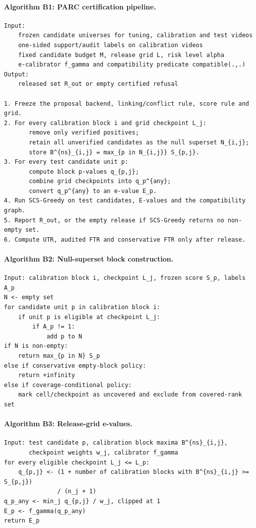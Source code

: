 \documentclass[11pt]{article}
\begin{document}
\paragraph{Algorithm B1: PARC certification pipeline.}
\begin{verbatim}
Input:
    frozen candidate universes for tuning, calibration and test videos
    one-sided support/audit labels on calibration videos
    fixed candidate budget M, release grid L, risk level alpha
    e-calibrator f_gamma and compatibility predicate compatible(.,.)
Output:
    released set R_out or empty certified refusal

1. Freeze the proposal backend, linking/conflict rule, score rule and grid.
2. For every calibration block i and grid checkpoint L_j:
       remove only verified positives;
       retain all unverified candidates as the null superset N_{i,j};
       store B^{ns}_{i,j} = max_{p in N_{i,j}} S_{p,j}.
3. For every test candidate unit p:
       compute block p-values q_{p,j};
       combine grid checkpoints into q_p^{any};
       convert q_p^{any} to an e-value E_p.
4. Run SCS-Greedy on test candidates, E-values and the compatibility graph.
5. Report R_out, or the empty release if SCS-Greedy returns no non-empty set.
6. Compute UTR, audited FTR and conservative FTR only after release.
\end{verbatim}

\paragraph{Algorithm B2: Null-superset block construction.}
\begin{verbatim}
Input: calibration block i, checkpoint L_j, frozen score S_p, labels A_p
N <- empty set
for candidate unit p in calibration block i:
    if unit p is eligible at checkpoint L_j:
        if A_p != 1:
            add p to N
if N is non-empty:
    return max_{p in N} S_p
else if conservative empty-block policy:
    return +infinity
else if coverage-conditional policy:
    mark cell/checkpoint as uncovered and exclude from covered-rank set
\end{verbatim}

\paragraph{Algorithm B3: Release-grid e-values.}
\begin{verbatim}
Input: test candidate p, calibration block maxima B^{ns}_{i,j},
       checkpoint weights w_j, calibrator f_gamma
for every eligible checkpoint L_j <= L_p:
    q_{p,j} <- (1 + number of calibration blocks with B^{ns}_{i,j} >= S_{p,j})
               / (n_j + 1)
q_p_any <- min_j q_{p,j} / w_j, clipped at 1
E_p <- f_gamma(q_p_any)
return E_p
\end{verbatim}
\end{document}
